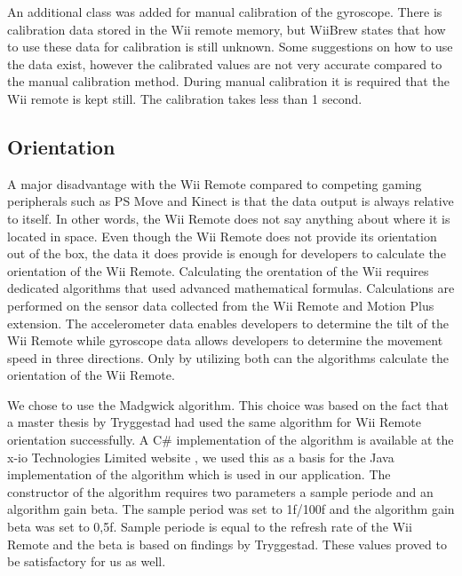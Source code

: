 An additional class was added for manual calibration of the gyroscope. There is calibration data stored in the Wii remote memory, but WiiBrew states that how to use these data for calibration is still unknown. Some suggestions on how to use the data exist, however the calibrated values are not very accurate compared to the manual calibration method. During manual calibration it is required that the Wii remote is kept still. The calibration takes less than 1 second.


\subsection{Orientation}
A major disadvantage with the Wii Remote compared to competing gaming peripherals such as PS Move and Kinect is that the data output is always relative to itself. In other words, the Wii Remote does not say anything about where it is located in space. Even though the Wii Remote does not provide its orientation out of the box, the data it does provide is enough for developers to calculate the orientation of the Wii Remote. Calculating the orentation of the Wii requires dedicated algorithms that used advanced mathematical formulas. Calculations are performed on the sensor data collected from the Wii Remote and Motion Plus extension. The accelerometer data enables developers to determine the tilt of the Wii Remote while gyroscope data allows developers to determine the movement speed in three directions. Only by utilizing both can the algorithms calculate the orientation of the Wii Remote.

We chose to use the Madgwick algorithm\cite{madgwick}. This choice was based on the fact that a master thesis by Tryggestad\cite{Tryggestad} had used the same algorithm for Wii Remote orientation successfully. A C\# implementation of the algorithm is available at the x-io Technologies Limited website \cite{opensourceMadgwick}, we used this as a basis for the Java implementation of the algorithm which is used in our application. The constructor of the algorithm requires two parameters a sample periode and an algorithm gain beta. The sample period was set to 1f/100f and the algorithm gain beta was set to 0,5f. Sample periode is equal to the refresh rate of the Wii Remote and the beta is based on findings by Tryggestad. These values proved to be satisfactory for us as well.

